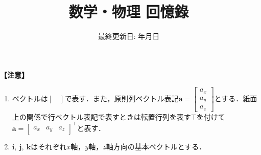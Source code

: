 \documentclass[
	report, paper=a4, head_space=23mm, foot_space=13mm,
	fontsize=8pt, jafontsize=8pt,
	gutter=20mm, line_length=170mm,
	fleqn, twoside
]{jlreq}
\makeatletter
\newcommand*{\themonth}{\two@digits\month}
\newcommand*{\theday}{\two@digits\day}
\renewcommand{\today}{{\the\year}年{\themonth}月{\theday}日}
\makeatother
\begin{document}
\title{\fontsize{40pt}{1\zh} 数学・物理 回憶錄}
\date{\LARGE 最終更新日: \today}
\maketitle

\setcounter{tocdepth}{2}
\begin{multicols}{2}
\tableofcontents
	
\end{multicols}



\noindent
\textbf{【注意】}
\begin{enumerate}[leftmargin=15pt]
	\item ベクトルは$[\quad]$で表す．また，原則列ベクトル表記$\bm{a} =
		\begin{bmatrix}
			a_x\\ a_y\\ a_z
		\end{bmatrix}$とする．紙面上の関係で行ベクトル表記で表すときは転置行列を表す$\top$を付けて$\bm{a} =
		{
			\begin{bmatrix}
			a_x & a_y & a_z
		\end{bmatrix}
		}^\top$と表す．
	\item $\bm{i},\ \bm{j},\ \bm{k}$はそれぞれ$x$軸，$y$軸，$z$軸方向の基本ベクトルとする．
\end{enumerate}


% 
% 
% 
% 


% 
% 
% 
% 
% 
% 
% 
% 
% 
% 
% 
% 
% 
% 
% 
% 
% 
% 
% 
% 

\end{document}
